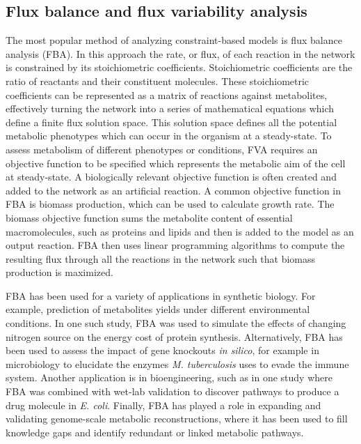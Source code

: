 \documentclass[10pt,letterpaper]{article}
\begin{document}
\subsection*{Flux balance and flux variability analysis}
The most popular method of analyzing constraint-based models is flux balance analysis (FBA). In this approach the rate, or flux, of each reaction in the network is constrained by its stoichiometric coefficients. Stoichiometric coefficients are the ratio of reactants and their constituent molecules. These stoichiometric coefficients can be represented as a matrix of reactions against metabolites, effectively turning the network into a series of mathematical equations which define a finite flux solution space\cite{Orth}. This solution space defines all the potential metabolic phenotypes which can occur in the organism at a steady-state\cite{Wiback}. 
To assess metabolism of different phenotypes or conditions, FVA requires an objective function to be specified which represents the metabolic aim of the cell at steady-state. A biologically relevant objective function is often created and added to the network as an artificial reaction. A common objective function in FBA is biomass production, which can be used to calculate growth rate. The biomass objective function sums the metabolite content of essential macromolecules, such as proteins and lipids and then is added to the model as an output reaction\cite{Feist}. FBA then uses linear programming algorithms to compute the resulting flux through all the reactions in the network such that biomass production is maximized\cite{Orth}. 

FBA has been used for a variety of applications in synthetic biology. For example, prediction of metabolites yields under different environmental conditions. In one such study, FBA was used to simulate the effects of changing nitrogen source on the energy cost of protein synthesis\cite{Arnold}. Alternatively, FBA has been used to assess the impact of gene knockouts \textit{in silico}, for example in microbiology to elucidate the enzymes \textit{M. tuberculosis} uses to evade the immune system\cite{Bose}. Another application is in bioengineering, such as in one study where FBA was combined with wet-lab validation to discover pathways to produce a drug molecule in \textit{E. coli}\cite{Immanuel}. Finally, FBA has played a role in expanding and validating genome-scale metabolic reconstructions, where it has been used to fill knowledge gaps\cite{Karp} and identify redundant or linked metabolic pathways\cite{Papin}.
\end{document}
